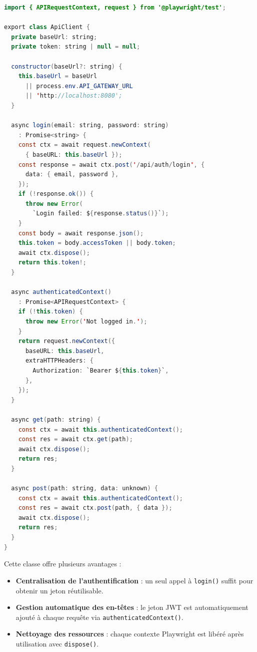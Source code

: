 \begin{lstlisting}[language=Java, caption={Classe utilitaire ApiClient -- api-client.ts}, label={lst:api-client}]
import { APIRequestContext, request } from '@playwright/test';

export class ApiClient {
  private baseUrl: string;
  private token: string | null = null;

  constructor(baseUrl?: string) {
    this.baseUrl = baseUrl
      || process.env.API_GATEWAY_URL
      || 'http://localhost:8080';
  }

  async login(email: string, password: string)
    : Promise<string> {
    const ctx = await request.newContext(
      { baseURL: this.baseUrl });
    const response = await ctx.post('/api/auth/login', {
      data: { email, password },
    });
    if (!response.ok()) {
      throw new Error(
        `Login failed: ${response.status()}`);
    }
    const body = await response.json();
    this.token = body.accessToken || body.token;
    await ctx.dispose();
    return this.token!;
  }

  async authenticatedContext()
    : Promise<APIRequestContext> {
    if (!this.token) {
      throw new Error('Not logged in.');
    }
    return request.newContext({
      baseURL: this.baseUrl,
      extraHTTPHeaders: {
        Authorization: `Bearer ${this.token}`,
      },
    });
  }

  async get(path: string) {
    const ctx = await this.authenticatedContext();
    const res = await ctx.get(path);
    await ctx.dispose();
    return res;
  }

  async post(path: string, data: unknown) {
    const ctx = await this.authenticatedContext();
    const res = await ctx.post(path, { data });
    await ctx.dispose();
    return res;
  }
}
\end{lstlisting}

Cette classe offre plusieurs avantages :
\begin{itemize}
  \item \textbf{Centralisation de l'authentification} : un seul appel à
        \texttt{login()} suffit pour obtenir un jeton réutilisable.
  \item \textbf{Gestion automatique des en-têtes} : le jeton JWT est
        automatiquement ajouté à chaque requête via
        \texttt{authenticatedContext()}.
  \item \textbf{Nettoyage des ressources} : chaque contexte Playwright est
        libéré après utilisation avec \texttt{dispose()}.
\end{itemize}

